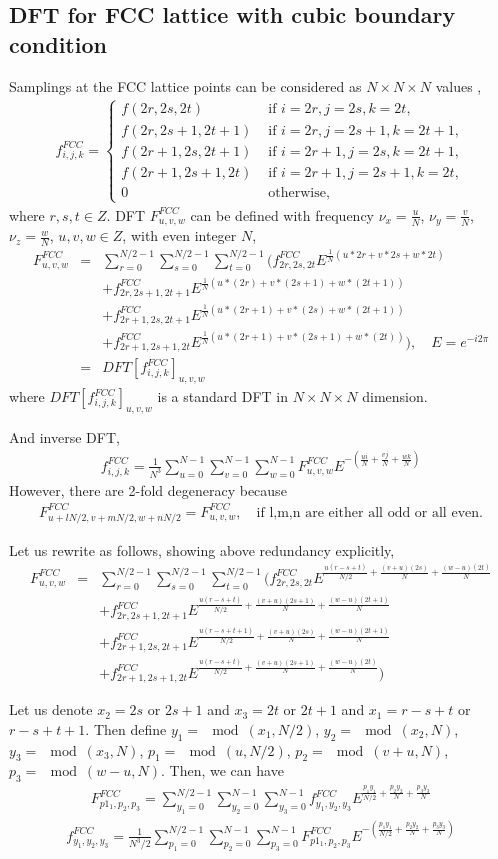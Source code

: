 \documentclass[10pt]{book}
\newcommand{\bea}{\begin{eqnarray}}
\newcommand{\eea}{\end{eqnarray}}
\newcommand{\no}{\nonumber \\}
\begin{document}
\subsection{DFT for FCC lattice with cubic boundary condition}  
Samplings at the FCC lattice points can be considered as
$N\times N\times N$  values ,
\bea 
f_{i,j,k}^{FCC} =\left\{ \begin{array}{cc}
	f(2r,2s,2t)  &\mbox{ if } i=2r,j=2s,k=2t,\\ 
	f(2r,2s+1,2t+1) &\mbox{ if } i=2r,j=2s+1,k=2t+1,\\ 
	f(2r+1,2s,2t+1) &\mbox{ if } i=2r+1,j=2s,k=2t+1,\\ 
	f(2r+1,2s+1,2t) &\mbox{ if } i=2r+1,j=2s+1,k=2t,\\ 
	0 &\mbox{ otherwise},
\end{array} \right. 
\eea   
where $r,s,t\in Z$.
DFT $F^{FCC}_{u,v,w}$ can be defined with frequency $\nu_x=\frac{u}{N}$,
$\nu_y=\frac{v}{N}$, $\nu_z=\frac{w}{N}$, $u,v,w\in Z$, with even integer $N$,
\bea 
F^{FCC}_{u,v,w}&=&\sum_{r=0}^{N/2-1}\sum_{s=0}^{N/2-1}\sum_{t=0}^{N/2-1}
\Big( f^{FCC}_{2r,2s,2t} E^{\frac{1}{N}(u*2r+v*2s+w*2t)} \no & &
+f^{FCC}_{2r,2s+1,2t+1} E^{\frac{1}{N}(u*(2r)+v*(2s+1)+w*(2t+1))} \no & &
+f^{FCC}_{2r+1,2s,2t+1} E^{\frac{1}{N}(u*(2r+1)+v*(2s)+w*(2t+1))} \no & &
+f^{FCC}_{2r+1,2s+1,2t} E^{\frac{1}{N}(u*(2r+1)+v*(2s+1)+w*(2t))} 
\Big),
\quad E=e^{-i2\pi} \no 
&=& DFT[f_{i,j,k}^{FCC}]_{u,v,w}
\eea 
where $DFT[f_{i,j,k}^{FCC}]_{u,v,w}$ is a standard DFT in $N\times N\times N$ dimension. 

And inverse DFT,
\bea 
f^{FCC}_{i,j,k}=\frac{1}{N^3}\sum_{u=0}^{N-1}\sum_{v=0}^{N-1}\sum_{w=0}^{N-1}
F^{FCC}_{u,v,w} E^{-\left(\frac{u i}{N}+\frac{v j}{N}+\frac{w k}{N}   \right)   }
\eea  
However, there are 2-fold degeneracy  because 
\bea 
F^{FCC}_{u+l N/2,v+m N/2,w+n N/2}=F^{FCC}_{u,v,w},\quad \mbox{if l,m,n are either all odd or all even.}
\eea 

Let us rewrite as follows, showing above redundancy explicitly, 
\bea 
F^{FCC}_{u,v,w}&=&\sum_{r=0}^{N/2-1}\sum_{s=0}^{N/2-1}\sum_{t=0}^{N/2-1}
\Big( f^{FCC}_{2r,2s,2t} E^{\frac{u(r-s+t)}{N/2}+\frac{(v+u)(2s)}{N}+\frac{(w-u)(2t)}{N}} \no & &
+f^{FCC}_{2r,2s+1,2t+1} E^{\frac{u(r-s+t)}{N/2}+\frac{(v+u)(2s+1)}{N}+\frac{(w-u)(2t+1)}{N}} \no & &
+f^{FCC}_{2r+1,2s,2t+1} E^{\frac{u(r-s+t+1)}{N/2}+\frac{(v+u)(2s)}{N}+\frac{(w-u)(2t+1)}{N}} \no & &
+f^{FCC}_{2r+1,2s+1,2t} E^{\frac{u(r-s+t)}{N/2}+\frac{(v+u)(2s+1)}{N}+\frac{(w-u)(2t)}{N} } 
\Big)
\eea 

Let us denote $x_2=2s$ or $2s+1$ and $x_3=2t$ or $2t+1$ and $x_1=r-s+t$ or $r-s+t+1$.
Then define $y_1=\mod(x_1,N/2)$, $y_2=\mod(x_2,N)$, $y_3=\mod(x_3,N)$,
$p_1=\mod(u,N/2)$, $p_2=\mod(v+u,N)$, $p_3=\mod(w-u,N)$. Then, we can have
\bea 
F^{FCC}_{p1_1,p_2,p_3}=\sum_{y_1=0}^{N/2-1}\sum_{y_2=0}^{N-1}\sum_{y_3=0}^{N-1}
f^{FCC}_{y_1, y_2, y_3} E^{\frac{p_1 y_1}{N/2}+\frac{p_2 y_2}{N}+\frac{p_3 y_3}{N}}
\eea 
\bea 
f^{FCC}_{y_1, y_2, y_3}=\frac{1}{N^3/2}  \sum_{p_1=0}^{N/2-1}\sum_{p_2=0}^{N-1}\sum_{p_3=0}^{N-1} F^{FCC}_{p1_1,p_2,p_3}
E^{-(\frac{p_1 y_1}{N/2}+\frac{p_2 y_2}{N}+\frac{p_3 y_3}{N})}
\eea 
\end{document}
